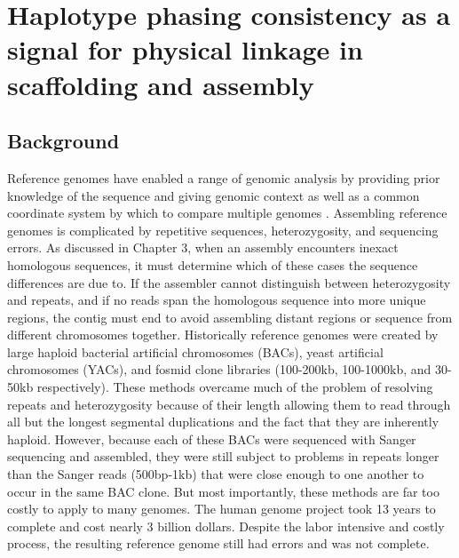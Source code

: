 %
\chapter{Haplotype phasing consistency as a signal for physical linkage in scaffolding and assembly}

\ifpdf
    \graphicspath{{Chapter4/Figs/Raster/}{Chapter4/Figs/PDF/}{Chapter4/Figs/}}
\else
    \graphicspath{{Chapter4/Figs/Vector/}{Chapter4/Figs/}}
\fi



\section{Background}
\par{
Reference genomes have enabled a range of genomic analysis by providing prior knowledge of the sequence 
and giving genomic context as well as a common coordinate system by which to compare multiple genomes \cite{1000genomes} \cite{GRCh38}. Assembling reference genomes is complicated by repetitive sequences, heterozygosity, and sequencing errors. As discussed in Chapter 3, when an assembly encounters inexact homologous sequences, it must determine which of these cases the sequence differences are due to. 
If the assembler cannot distinguish between heterozygosity and repeats, and if no reads span the homologous sequence into more unique regions, the contig must end
to avoid assembling distant regions or sequence from different chromosomes together. Historically reference genomes were created by large haploid bacterial artificial chromosomes (BACs), yeast artificial chromosomes (YACs), and fosmid clone libraries \cite{human} (100-200kb, 100-1000kb, and 30-50kb respectively). 
These methods overcame much of the problem of resolving repeats and heterozygosity because of their length allowing them to read through all but the longest segmental duplications and the fact that they are inherently haploid. However, because each of these BACs were sequenced with Sanger sequencing and assembled, they were still subject to problems in repeats longer than the Sanger reads (500bp-1kb) that were close enough to one another to occur in the same BAC clone. But most importantly, these methods are far too costly to apply to many genomes. The human genome project took 13 years to complete and cost nearly 3 billion dollars\cite{genomeproject}. Despite the labor intensive and costly process, the resulting reference genome still had errors and was not complete\cite{grch38}.
} 

